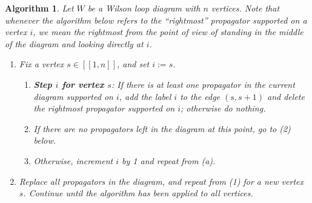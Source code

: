 \documentclass[11pt]{article}
\newcommand{\interval}[2]{[\![#1,#2]\!]}
\newtheorem{algorithm}[thm]{Algorithm}
\theoremstyle{remark}
\theoremstyle{definition}
\begin{document}
\begin{algorithm}\label{alg:put GN on WLD}
Let $W$ be a Wilson loop diagram with $n$ vertices.  Note that whenever the algorithm below refers to the ``rightmost'' propagator supported on a vertex $i$, we mean the rightmost from the point of view of standing in the middle of the diagram and looking directly at $i$.

\begin{enumerate}
\item Fix a vertex $s \in \interval{1}{n}$, and set $i:=s$.
\begin{enumerate}
\item \textbf{Step $i$ for vertex $s$}: If there is at least one propagator in the current diagram supported on $i$, add the label $i$ to the edge $(s,s+1)$ and delete the rightmost propagator supported on $i$; otherwise do nothing.
\item If there are no propagators left in the diagram at this point, go to (2) below.
\item Otherwise, increment $i$ by 1 and repeat from (a).
\end{enumerate}
\item Replace all propagators in the diagram, and repeat from (1) for a new vertex $s$.  Continue until the algorithm has been applied to all vertices.
\end{enumerate}
\end{algorithm}
\end{document}
